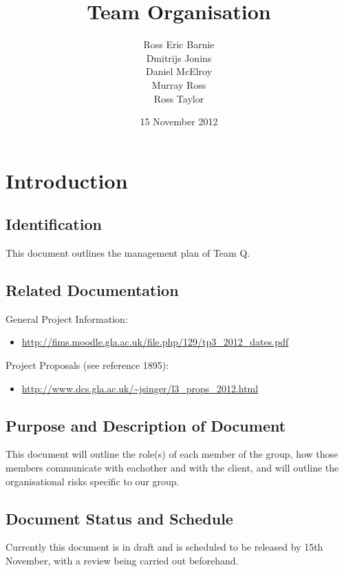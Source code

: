 \documentclass{l3deliverable}
\title{Team Organisation}
\author{
  Ross Eric Barnie \\
  Dmitrijs Jonins \\
  Daniel McElroy \\
  Murray Ross \\
  Ross Taylor
}
\date{15 November 2012}
\begin{document}

\maketitle


\section{Introduction}

\subsection{Identification}

This document outlines the management plan of Team Q.

\subsection{Related Documentation}

General Project Information:
\begin{itemize}
\item{\url{http://fims.moodle.gla.ac.uk/file.php/129/tp3_2012_dates.pdf}}
\end{itemize}

Project Proposals (see reference 1895):
\begin{itemize}
\item{\url{http://www.dcs.gla.ac.uk/~jsinger/l3_props_2012.html}}
\end{itemize}

\subsection{Purpose and Description of Document}

This document will outline the role(s) of each member of the group, how those
members communicate with eachother and with the client, and will outline the
organisational risks specific to our group.

\subsection{Document Status and Schedule}

Currently this document is in draft and is scheduled to be released by 15th
November, with a review being carried out beforehand.
\end{document}
